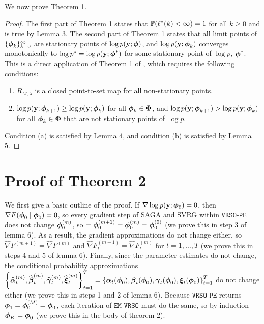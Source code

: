 We now prove Theorem 1.

\begin{proof}

The first part of Theorem 1 states that $\mathbb{P}(\ell^*(k) < \infty) = 1$ for all $k \geq 0$ and is true by Lemma 3. The second part of Theorem 1 states that all limit points of $\{\boldsymbol{\phi}_{k}\}_{k=0}^\infty$ are stationary points of $\log p(\mathbf{y};\boldsymbol{\phi})$, and $\log p(\mathbf{y};\boldsymbol{\phi}_{k})$ converges monotonically to $\log p^* = \log p(\mathbf{y};\boldsymbol{\phi}^*)$ for some stationary point of $\log p$, $\boldsymbol{\phi}^*$. This is a direct application of Theorem 1 of \citet{Wu:1983}, which requires the following conditions:

\begin{enumerate}[label=(\alph*)]
    \item $R_{M,\lambda}$ is a closed point-to-set map for all non-stationary points.
    \item $\log p(\mathbf{y};\boldsymbol{\phi}_{k+1}) \geq \log p(\mathbf{y};\boldsymbol{\phi}_k)$ for all $\boldsymbol{\phi}_k  \in \boldsymbol{\Phi}$, and $\log p(\mathbf{y};\boldsymbol{\phi}_{k+1}) > \log p(\mathbf{y};\boldsymbol{\phi}_k)$ for all $\boldsymbol{\phi}_k \in \boldsymbol{\Phi}$ that are not stationary points of $\log p$.
\end{enumerate}

Condition (a) is satisfied by Lemma 4, and condition (b) is satisfied by Lemma 5. 
%
\end{proof}

\section{Proof of Theorem 2}

We first give a basic outline of the proof. If $\nabla \log p(\mathbf{y};\boldsymbol{\phi}_0) = 0$, then $\nabla F(\boldsymbol{\phi}_0 \mid \boldsymbol{\phi}_0) = 0$, so every gradient step of SAGA and SVRG within $\texttt{VRSO-PE}$ does not change $\boldsymbol{\phi}_0^{(m)}$, so $ = \boldsymbol{\phi}_0^{(m+1)} =  \boldsymbol{\phi}_0^{(m)} = \boldsymbol{\phi}^{(0)}_0$ (we prove this in step 3 of lemma 6). As a result, the gradient approximations do not change either, so $\widehat \nabla F^{(m+1)} = \widehat \nabla F^{(m)}$ and $\widehat \nabla F^{(m+1)}_t = \widehat \nabla F^{(m)}_t$ for $t = 1,\ldots,T$ (we prove this in steps 4 and 5 of lemma 6). Finally, since the parameter estimates do not change, the conditional probability approximations $\left\{\widehat {\boldsymbol{\alpha}}^{(m)}_t, \widehat {\boldsymbol{\beta}}^{(m)}_t, \widehat {\boldsymbol{\gamma}}^{(m)}_t, \widehat {\boldsymbol{\xi}}^{(m)}_t\right\}_{t=1}^T = \left\{\boldsymbol{\alpha}_t(\boldsymbol{\phi}_0), \boldsymbol{\beta}_t(\boldsymbol{\phi}_0), \boldsymbol{\gamma}_t(\boldsymbol{\phi}_0), \boldsymbol{\xi}_t(\boldsymbol{\phi}_0) \right\}_{t=1}^T$ do not change either (we prove this in steps 1 and 2 of lemma 6). Because $\texttt{VRSO-PE}$ returns $\boldsymbol{\phi}_1 = \boldsymbol{\phi}_0^{(M)} = \boldsymbol{\phi}_0$, each iteration of $\texttt{EM-VRSO}$ must do the same, so by induction $\boldsymbol{\phi}_K = \boldsymbol{\phi}_0$ (we prove this in the body of theorem 2).

